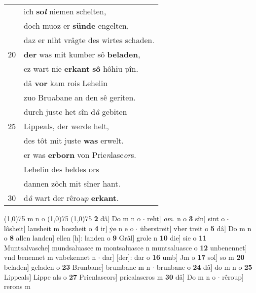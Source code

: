 \documentclass[8pt,a4paper,notitlepage]{article}
\begin{document}
\begin{table}[ht]
\begin{minipage}[t]{0.5\linewidth}
\begin{tabular}{rl}
 & ich \textbf{so\textit{l}} niemen schelten,\\ 
 & doch muoz er \textbf{sünde} engelten,\\ 
 & daz er niht vrâgte des wirtes schaden.\\ 
20 & \textbf{der} was mit kumber sô \textbf{beladen},\\ 
 & ez wart nie \textbf{erkant} \textbf{sô} hôhiu pîn.\\ 
 & dâ \textbf{vor} kam rois Lehelin\\ 
 & zuo Bru\textit{n}bane an den sê geriten.\\ 
 & durch juste het sîn d\textit{â} gebiten\\ 
25 & Lippeals, der werde helt,\\ 
 & des tôt mit juste \textbf{was} erwelt.\\ 
 & er was \textbf{erborn} von Prie\textit{n}lasc\textit{or}s.\\ 
 & Lehelin des heldes ors\\ 
 & dannen zôch mit sîner hant.\\ 
30 & d\textit{â} wart der rêro\textit{up} \textbf{erkant}.\\ 
\end{tabular}
\scriptsize
\line(1,0){75} \newline
m n o \newline
\line(1,0){75} \newline
\newline
\line(1,0){75} \newline
\textbf{2} dâ] Do m n o  $\cdot$ reht] \textit{om.} n o \textbf{3} sîn] sint o  $\cdot$ lôsheit] lausheit m boszheit o \textbf{4} ir] ẏe n e o  $\cdot$ überstreit] vber treit o \textbf{5} dâ] Do m n o \textbf{8} allen landen] ellen [h]: landen o \textbf{9} Grâl] grole n \textbf{10} die] sie o \textbf{11} Muntsalvasche] mundsaluasce m montsaluasce n muntsaluasce o \textbf{12} unbenennet] vnd benennet m vnbekennet n  $\cdot$ dar] [der]: dar o \textbf{16} umb] Jm o \textbf{17} sol] so m \textbf{20} beladen] geladen o \textbf{23} Brunbane] brumbane m n  $\cdot$ brunbane o \textbf{24} dâ] do m n o \textbf{25} Lippeals] Lippe als o \textbf{27} Prienlascors] priealascros m \textbf{30} dâ] Do m n o  $\cdot$ rêroup] rerons m \newline
\end{minipage}
\end{table}
\newpage
\end{document}
